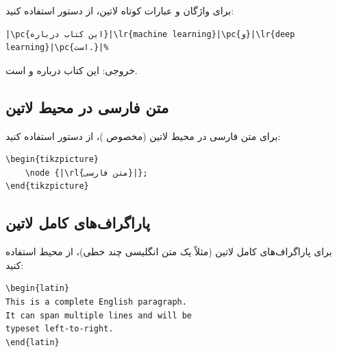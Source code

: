 برای واژگان و عبارات کوتاه لاتین، از دستور
 استفاده کنید:

\begin{latin}
\begin{verbatim}
|\pc{این کتاب درباره}|\lr{machine learning}|\pc{و}|\lr{deep learning}|\pc{است.}|%
\end{verbatim}
\end{latin}

خروجی: این کتاب درباره 
و  است.


\subsection{متن فارسی در محیط لاتین}
\label{sec:text-persian-in-latin}

برای متن فارسی در محیط لاتین (مخصوص
)، از دستور 
استفاده کنید:

\begin{latin}
\begin{verbatim}
\begin{tikzpicture}
    \node {|\rl{متن فارسی}|};
\end{tikzpicture}
\end{verbatim}
\end{latin}


\subsection{پاراگراف‌های کامل لاتین}
\label{sec:text-latin-block}

برای پاراگراف‌های کامل لاتین (مثلاً یک متن
انگلیسی چند خطی)، از محیط  استفاده
کنید:

\begin{latin}
\begin{verbatim}
\begin{latin}
This is a complete English paragraph.
It can span multiple lines and will be
typeset left-to-right.
\end{latin}
\end{verbatim}
\end{latin}


